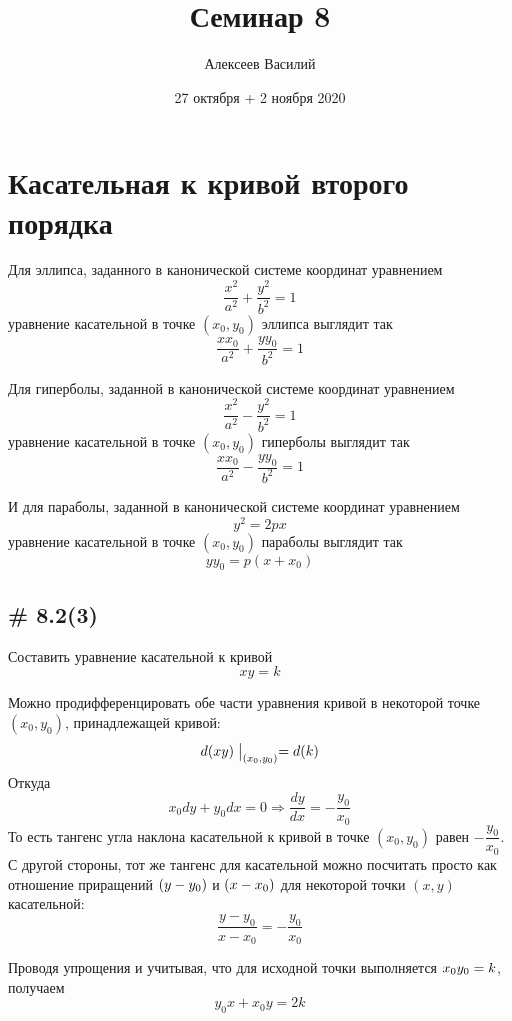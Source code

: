 \documentclass[a4paper,12pt]{article}
\author{Алексеев Василий}
\title{Семинар 8}
\date{27 октября + 2 ноября 2020}
\begin{document}
  \maketitle
  
  \tableofcontents

  \thispagestyle{empty}
  
  \newpage
  


  \section{Касательная к кривой второго порядка}
  
  Для эллипса, заданного в канонической системе координат уравнением
  \[
    \frac{x^2}{a^2} + \frac{y^2}{b^2} = 1
  \]
  уравнение касательной в точке $(x_0, y_0)$ эллипса выглядит так
  \[
    \boxed{\frac{xx_0}{a^2} + \frac{yy_0}{b^2} = 1}
  \]
  
  Для гиперболы, заданной в канонической системе координат уравнением
  \[
    \frac{x^2}{a^2} - \frac{y^2}{b^2} = 1
  \]
  уравнение касательной в точке $(x_0, y_0)$ гиперболы выглядит так
  \[
    \boxed{\frac{xx_0}{a^2} - \frac{yy_0}{b^2} = 1}
  \]
  
  И для параболы, заданной в канонической системе координат уравнением
  \[
    y^2 = 2px
  \]
  уравнение касательной в точке $(x_0, y_0)$ параболы выглядит так
  \[
    \boxed{yy_0 = p (x + x_0)}
  \]
  
  
  \subsection{\# 8.2(3)}
  
  Составить уравнение касательной к кривой
  \[
    xy = k
  \]

  \begin{solution}
    Можно продифференцировать обе части уравнения кривой в некоторой точке $(x_0, y_0)$, принадлежащей кривой:
    \[
      d(xy)\bigm|_{(x_0, y_0)} = d(k)
    \]
    Откуда
    \[
      x_0 dy + y_0 dx = 0 \Rightarrow \frac{dy}{dx} = -\frac{y_0}{x_0}
    \]
    То есть тангенс угла наклона касательной к кривой в точке $(x_0, y_0)$ равен $-\dfrac{y_0}{x_0}$.
    С другой стороны, тот же тангенс для касательной можно посчитать просто как отношение приращений $(y \hm- y_0)$ и $(x \hm- x_0)$ для некоторой точки $(x, y)$ касательной:
    \[
      \frac{y - y_0}{x - x_0} = -\frac{y_0}{x_0}
    \]
    
    Проводя упрощения и учитывая, что для исходной точки выполняется $x_0 y_0 \hm= k$, получаем
    \[
      y_0 x + x_0 y = 2k
    \]
  \end{solution}
  
\end{document}
